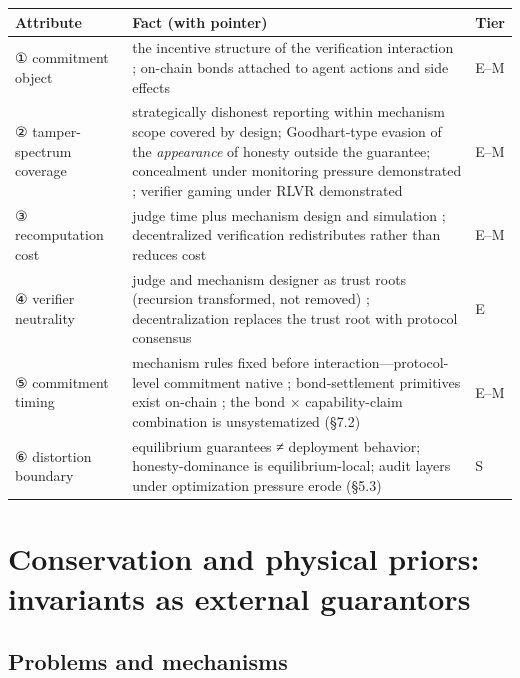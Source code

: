 \documentclass[11pt,a4paper]{article}
\begin{document}
\begin{table}[htbp]
\centering
\footnotesize
\setlength{\tabcolsep}{3.5pt}
\renewcommand{\arraystretch}{1.18}
\begin{tabularx}{0.985\textwidth}{>{\raggedright\arraybackslash}p{} >{\raggedright\arraybackslash}X >{\raggedright\arraybackslash}p{}}
\toprule
\textbf{Attribute} & \textbf{Fact (with pointer)} & \textbf{Tier} \\
\midrule
① commitment object & the incentive structure of the verification interaction \cite{key09,key10}; on-chain bonds attached to agent actions and side effects \cite{key48,key49,key50} & E–M \\
② tamper-spectrum coverage & strategically dishonest reporting within mechanism scope covered by design; Goodhart-type evasion of the \textit{appearance} of honesty outside the guarantee; concealment under monitoring pressure demonstrated \cite{key30}; verifier gaming under RLVR demonstrated \cite{key47} & E–M \\
③ recomputation cost & judge time plus mechanism design and simulation \cite{key09}; decentralized verification redistributes rather than reduces cost \cite{key44,key45,key46} & E–M \\
④ verifier neutrality & judge and mechanism designer as trust roots (recursion transformed, not removed) \cite{key09,key10}; decentralization replaces the trust root with protocol consensus \cite{key44,key45,key46} & E \\
⑤ commitment timing & mechanism rules fixed before interaction—protocol-level commitment native \cite{key09,key10}; bond-settlement primitives exist on-chain \cite{key48,key49,key50}; the bond × capability-claim combination is unsystematized (§7.2) & E–M \\
⑥ distortion boundary & equilibrium guarantees ≠ deployment behavior; honesty-dominance is equilibrium-local; audit layers under optimization pressure erode (§5.3) & S \\
\bottomrule
\end{tabularx}
\end{table}

\section{Conservation and physical priors: invariants as external guarantors}

\subsection{Problems and mechanisms}
\end{document}
